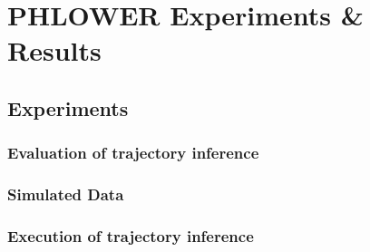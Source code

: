 \chapter{PHLOWER Experiments \& Results}
\label{chapter:PHLOWER_bench}

\graphicspath{{chapter5/figs}}

\section{Experiments}
\subsection{Evaluation of trajectory inference}
\subsection{Simulated Data}
\subsection{Execution of trajectory inference}
